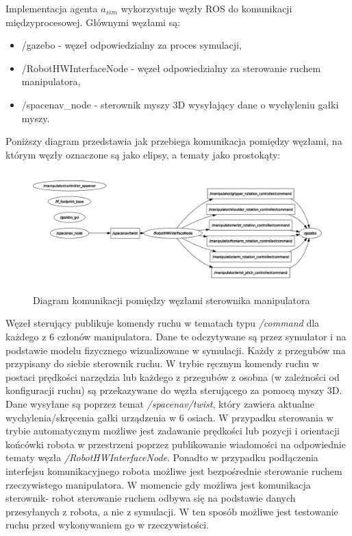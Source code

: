 \documentclass[a4paper, 12pt, twoside]{article}
\begin{document}
Implementacja agenta $a_{sim}$ wykorzystuje węzły ROS do komunikacji międzyprocesowej. Głównymi węzłami są:

\begin{itemize}
\item /gazebo - węzeł odpowiedzialny za proces symulacji,
\item /RobotHWInterfaceNode - węzeł odpowiedzialny za sterowanie ruchem manipulatora,
\item /spacenav\_node - sterownik myszy 3D wysyłający dane o wychyleniu gałki myszy.
\end{itemize}

Poniższy diagram przedstawia jak przebiega komunikacja pomiędzy węzłami, na którym węzły oznaczone są jako elipsy, a tematy jako prostokąty:

\begin{figure}[hbt!]
\centering
\includegraphics[width=1.0\linewidth]{images/node_graph.png}
\caption{Diagram komunikacji pomiędzy węzłami sterownika manipulatora}
\label{fig:node_graph}
\end{figure}

Węzeł sterujący publikuje komendy ruchu w tematach typu \textit{/command} dla każdego z 6 członów manipulatora. Dane te odczytywane są przez symulator i na podstawie modelu fizycznego wizualizowane w symulacji. Każdy z przegubów ma przypisany do siebie sterownik ruchu. W trybie ręcznym komendy ruchu w postaci prędkości narzędzia lub każdego z przegubów z osobna (w zależności od konfiguracji ruchu) są przekazywane do węzła sterującego za pomocą myszy 3D. Dane wysyłane są poprzez temat \textit{/spacenav/twist}, który zawiera aktualne wychylenia/skręcenia gałki urządzenia w 6 osiach. W przypadku sterowania w trybie automatycznym możliwe jest zadawanie prędkości lub pozycji i orientacji końcówki robota w przestrzeni poprzez publikowanie wiadomości na odpowiednie tematy węzła \textit{/RobotHWInterfaceNode}. Ponadto w przypadku podłączenia interfejsu komunikacyjnego robota możliwe jest bezpośrednie sterowanie ruchem rzeczywistego manipulatora. W momencie gdy możliwa jest komunikacja sterownik- robot sterowanie ruchem odbywa się na podstawie danych przesyłanych z robota, a nie z symulacji. W ten sposób możliwe jest testowanie ruchu przed wykonywaniem go w rzeczywistości. 
\end{document}
